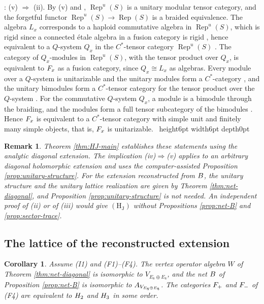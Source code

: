 \documentclass[leqno]{article}
\let\cal\relax
\newcommand{\cal}{\mathcal}
\newcommand{\qed}{\hfill \vrule height6pt  width6pt depth0pt}
\DeclareMathOperator{\Rep}{Rep}
\newtheorem{cor}[thm]{Corollary}
\newtheorem{remark}[thm]{Remark}
\newenvironment{proof}[1][]{\noindent {\it Proof #1} : }{\hbox{~}\qed
\smallskip
}
\numberwithin{equation}{section}
\begin{document}
\begin{proof}
(v) $\Rightarrow$ (ii). By (v) and \cite[Theorem 7.9 p.~53]{Gui19}, $\Rep^u(S)$ is a unitary modular tensor category, and the forgetful functor $\Rep^u(S) \to \Rep(S)$ is a braided equivalence. The algebra $L_x$ corresponds to a haploid commutative algebra in $\Rep^u(S)$, which is rigid since a connected étale algebra in a fusion category is rigid \cite[Remark 3.4 p.~7]{DMNO13}, hence equivalent to a $Q$-system $Q_x$ in the $C^*$-tensor category $\Rep^u(S)$ \cite[Theorem 3.2 p.~11]{CGGH23}. The category of $Q_x$-modules in $\Rep^u(S)$, with the tensor product over $Q_x$, is equivalent to $\cal F_x$ as a fusion category, since $Q_x \cong L_x$ as algebras. Every module over a $Q$-system is unitarizable and the unitary modules form a $C^*$-category \cite[Proposition 2.24 p.~26 and Theorem 2.28 p.~28]{Gui22}, and the unitary bimodules form a $C^*$-tensor category for the tensor product over the $Q$-system \cite[Theorem 3.13 p.~35]{Gui22}. For the commutative $Q$-system $Q_x$, a module is a bimodule through the braiding, and the modules form a full tensor subcategory of the bimodules \cite[Section 1]{KiO02}. Hence $\cal F_x$ is equivalent to a $C^*$-tensor category with simple unit and finitely many simple objects, that is, $\cal F_x$ is unitarizable.
\end{proof}

\begin{remark}\normalfont
\label{rem:status-equivalences}
Theorem \ref{thm:HJ-main} establishes these statements using the analytic diagonal extension. The implication (iv)$\Rightarrow$(v) applies to an arbitrary diagonal holomorphic extension and uses the computer-assisted Proposition \ref{prop:unitary-structure}. For the extension reconstructed from $\cal B$, the unitary structure and the unitary lattice realization are given by Theorem \ref{thm:net-diagonal}, and Proposition \ref{prop:unitary-structure} is not needed. An independent proof of (ii) or of (iii) would give $\mathrm{(H_J)}$ without Propositions \ref{prop:net-B} and \ref{prop:sector-trace}.
\end{remark}


\subsection{The lattice of the reconstructed extension}
\label{subsec:conditional}

\begin{cor}
\label{cor:HJ-conditional}
Assume \textup{(I1)} and \textup{(F1)}--\textup{(F4)}. The vertex operator algebra $W$ of Theorem \ref{thm:net-diagonal} is isomorphic to $V_{E_8 \oplus E_8}$, and the net $\cal B$ of Proposition \ref{prop:net-B} is isomorphic to $\cal A_{V_{E_8 \oplus E_8}}$. The categories $\cal F_+$ and $\cal F_-$ of \textup{(F4)} are equivalent to $\cal H_2$ and $\cal H_3$ in some order.
\end{cor}
\end{document}
